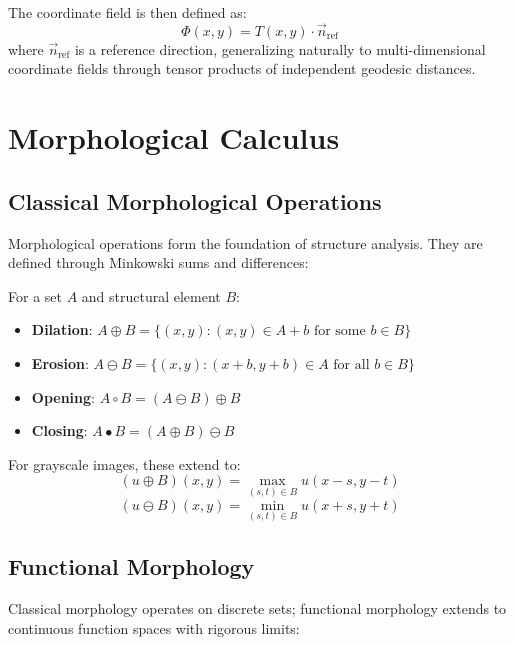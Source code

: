\documentclass[twocolumn,11pt]{article}
\begin{document}
The coordinate field is then defined as:
\begin{equation}
\Phi(x,y) = T(x,y) \cdot \vec{n}_{\text{ref}}
\end{equation}
where $\vec{n}_{\text{ref}}$ is a reference direction, generalizing naturally to multi-dimensional coordinate fields through tensor products of independent geodesic distances.

\section{Morphological Calculus}

\subsection{Classical Morphological Operations}

Morphological operations form the foundation of structure analysis. They are defined through Minkowski sums and differences:

\begin{definition}
For a set $A$ and structural element $B$:
\begin{itemize}
\item \textbf{Dilation}: $A \oplus B = \{(x,y) : (x,y) \in A + b \text{ for some } b \in B\}$
\item \textbf{Erosion}: $A \ominus B = \{(x,y) : (x+b, y+b) \in A \text{ for all } b \in B\}$
\item \textbf{Opening}: $A \circ B = (A \ominus B) \oplus B$
\item \textbf{Closing}: $A \bullet B = (A \oplus B) \ominus B$
\end{itemize}
\end{definition}

For grayscale images, these extend to:
\begin{equation}
(u \oplus B)(x,y) = \max_{(s,t) \in B} u(x-s, y-t)
\end{equation}
\begin{equation}
(u \ominus B)(x,y) = \min_{(s,t) \in B} u(x+s, y+t)
\end{equation}

\subsection{Functional Morphology}

Classical morphology operates on discrete sets; functional morphology extends to continuous function spaces with rigorous limits:
\end{document}
